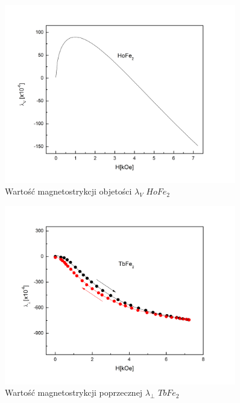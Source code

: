 \documentclass[a4paper,12pt]{article}
\numberwithin{equation}{section}
\begin{document}
\begin{figure}[h]
    \centering
    \includegraphics[width =0.9\textwidth]{../img/magneto/HoObjetosc}
    \caption{Wartość magnetostrykcji objetości $\lambda_{V}$ $HoFe_2$}
    \label{HoObjetosc}
\end{figure}



\begin{figure}[h]
    \centering
    \includegraphics[width =0.9\textwidth]{../img/magneto/Tbpoprzeczna}
    \caption{Wartość magnetostrykcji poprzecznej $\lambda_{\perp}$ $TbFe_2$}
    \label{Tbpoprzeczna}
\end{figure}
\end{document}
